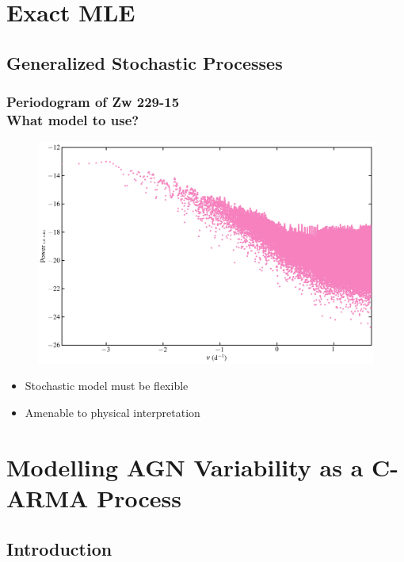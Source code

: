 \documentclass[hyperref={pdfpagelabels=false}]{beamer}
\begin{document}
\section{Exact MLE} 

\subsection{Generalized Stochastic Processes} 

\begin{frame}
\frametitle{Periodogram of Zw 229-15\\What model to use?}
  \begin{figure}
    \includegraphics[scale=0.05]{images/Periodogram.jpg}
  \end{figure}
  \begin{center}
    \centering
    \begin{itemize}
      \item Stochastic model must be flexible
      \item Amenable to physical interpretation
    \end{itemize}
  \end{center}
\end{frame}


\section{Modelling AGN Variability as a C-ARMA Process}

\subsection{Introduction}
\end{document}
